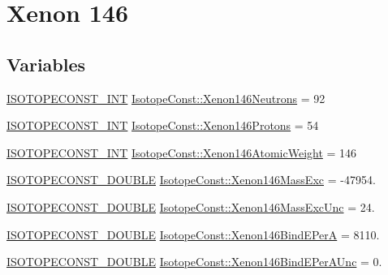 \hypertarget{group___isotope_const-_xenon-_xe146}{}\section{Xenon 146}
\label{group___isotope_const-_xenon-_xe146}
\subsection*{Variables}
\begin{DoxyCompactItemize}
\item 
\mbox{\hyperlink{group___isotope_const-_macros_ga5f18360b3e99483a35c32d789e62621c}{I\+S\+O\+T\+O\+P\+E\+C\+O\+N\+S\+T\+\_\+\+I\+NT}} \mbox{\hyperlink{group___isotope_const-_xenon-_xe146_gad1125aa0728ba31830823a2ea1569148}{Isotope\+Const\+::\+Xenon146\+Neutrons}} = 92
\item 
\mbox{\hyperlink{group___isotope_const-_macros_ga5f18360b3e99483a35c32d789e62621c}{I\+S\+O\+T\+O\+P\+E\+C\+O\+N\+S\+T\+\_\+\+I\+NT}} \mbox{\hyperlink{group___isotope_const-_xenon-_xe146_ga3a57668c490312720c2c2d210d5b75aa}{Isotope\+Const\+::\+Xenon146\+Protons}} = 54
\item 
\mbox{\hyperlink{group___isotope_const-_macros_ga5f18360b3e99483a35c32d789e62621c}{I\+S\+O\+T\+O\+P\+E\+C\+O\+N\+S\+T\+\_\+\+I\+NT}} \mbox{\hyperlink{group___isotope_const-_xenon-_xe146_ga3fb3b18ec7dadf9423da628572a09ffa}{Isotope\+Const\+::\+Xenon146\+Atomic\+Weight}} = 146
\item 
\mbox{\hyperlink{group___isotope_const-_macros_ga8f45a7272ce02c0b4c65c44636ed719a}{I\+S\+O\+T\+O\+P\+E\+C\+O\+N\+S\+T\+\_\+\+D\+O\+U\+B\+LE}} \mbox{\hyperlink{group___isotope_const-_xenon-_xe146_ga2894df026ce30691996c5e7e31d36376}{Isotope\+Const\+::\+Xenon146\+Mass\+Exc}} = -\/47954.
\item 
\mbox{\hyperlink{group___isotope_const-_macros_ga8f45a7272ce02c0b4c65c44636ed719a}{I\+S\+O\+T\+O\+P\+E\+C\+O\+N\+S\+T\+\_\+\+D\+O\+U\+B\+LE}} \mbox{\hyperlink{group___isotope_const-_xenon-_xe146_ga09e8f994b8c65d64dc8e173fc6422e47}{Isotope\+Const\+::\+Xenon146\+Mass\+Exc\+Unc}} = 24.
\item 
\mbox{\hyperlink{group___isotope_const-_macros_ga8f45a7272ce02c0b4c65c44636ed719a}{I\+S\+O\+T\+O\+P\+E\+C\+O\+N\+S\+T\+\_\+\+D\+O\+U\+B\+LE}} \mbox{\hyperlink{group___isotope_const-_xenon-_xe146_gaada92432863dda465847ef0dd85d6199}{Isotope\+Const\+::\+Xenon146\+Bind\+E\+PerA}} = 8110.
\item 
\mbox{\hyperlink{group___isotope_const-_macros_ga8f45a7272ce02c0b4c65c44636ed719a}{I\+S\+O\+T\+O\+P\+E\+C\+O\+N\+S\+T\+\_\+\+D\+O\+U\+B\+LE}} \mbox{\hyperlink{group___isotope_const-_xenon-_xe146_ga8b3029c0707af140ade4ef6105d4bc8f}{Isotope\+Const\+::\+Xenon146\+Bind\+E\+Per\+A\+Unc}} = 0.

\end{DoxyCompactItemize}
